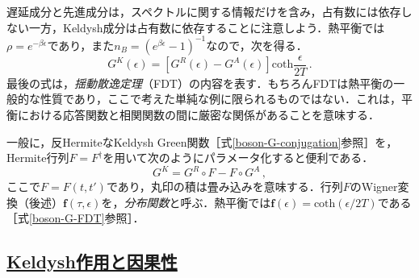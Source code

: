 \documentclass[a4paper,11pt]{ltjsarticle}
\newcommand{\subsectionlink}[1]{\subsection[#1]{\hyperlink{toc}{#1}}}
\begin{document}
遅延成分と先進成分は，スペクトルに関する情報だけを含み，占有数には依存しない一方，Keldysh成分は占有数に依存することに注意しよう．熱平衡では$\rho=e^{-\beta\epsilon}$であり，また$n_B=(e^{\beta\epsilon}-1)^{-1}$なので，次を得る．
\begin{equation}\label{boson-G-FDT}
G^{K}(\epsilon)=\left[G^{R}(\epsilon)-G^{A}(\epsilon)\right]
\mathrm{coth}\frac{\epsilon}{2T}\, .
\end{equation}最後の式は，\emph{揺動散逸定理}（FDT）の内容を表す．もちろんFDTは熱平衡の一般的な性質であり，ここで考えた単純な例に限られるものではない．これは，平衡における応答関数と相関関数の間に厳密な関係があることを意味する．


一般に，反HermiteなKeldysh Green関数［式\eqref{boson-G-conjugation}参照］を，Hermite行列$F=F^\dagger$を用いて次のようにパラメータ化すると便利である．
\begin{equation}\label{boson-G-FDT-general}
G^{K}=G^{R}\circ F-F\circ G^{A}  \, ,
\end{equation}ここで$F=F(t,t')$であり，丸印の積は畳み込みを意味する．行列$F$のWigner変換（後述）$\mathbf{f}(\tau,\epsilon)$を，\emph{分布関数}と呼ぶ．熱平衡では$\mathbf{f}(\epsilon) = \mbox{coth}(\epsilon/2T)$である［式\eqref{boson-G-FDT}参照］．


\subsectionlink{Keldysh作用と因果性}\label{sec_bosons-3}
\end{document}
